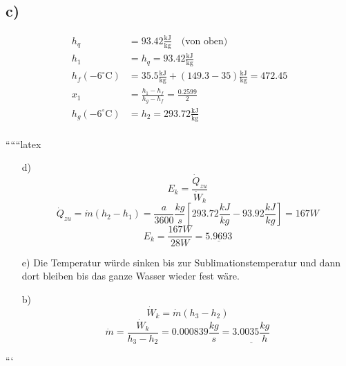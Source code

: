 \subsection*{c)}

\begin{align*}
    h_q &= 93.42 \frac{\text{kJ}}{\text{kg}} \quad \text{(von oben)} \\
    h_1 &= h_q = 93.42 \frac{\text{kJ}}{\text{kg}} \\
    h_f(-6^\circ \text{C}) &= 35.5 \frac{\text{kJ}}{\text{kg}} + (149.3 - 35) \frac{\text{kJ}}{\text{kg}} = 472.45 \\
    x_1 &= \frac{h_1 - h_f}{h_g - h_f} = \frac{0.2599}{2} \\
    h_g(-6^\circ \text{C}) &= h_2 = 293.72 \frac{\text{kJ}}{\text{kg}} \\
\end{align*}

``````latex


\begin{itemize}
    \item[d)] \[
    E_k = \frac{\dot{Q}_{zu}}{\dot{W}_k}
    \]
    \[
    \dot{Q}_{zu} = \dot{m} (h_2 - h_1) = \frac{a}{3600} \frac{kg}{s} \left[ 293.72 \frac{kJ}{kg} - 93.92 \frac{kJ}{kg} \right] = 167 W
    \]
    \[
    E_k = \frac{167 W}{28 W} = \underline{5.9693}
    \]
    
    \item[e)] Die Temperatur würde sinken bis zur Sublimationstemperatur und dann dort bleiben bis das ganze Wasser wieder fest wäre.
    
    \item[b)] \[
    \dot{W}_k = \dot{m} (h_3 - h_2)
    \]
    \[
    \dot{m} = \frac{\dot{W}_k}{h_3 - h_2} = 0.000839 \frac{kg}{s} = \underline{3.0035 \frac{kg}{h}}
    \]
    
\end{itemize}

```